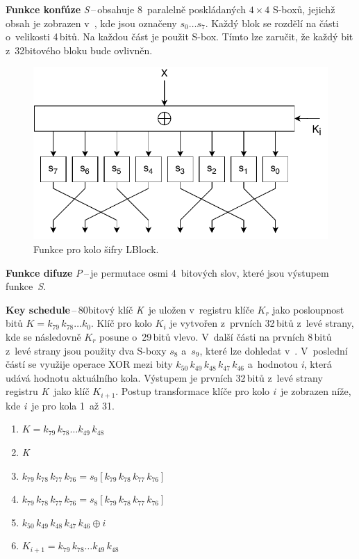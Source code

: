 \noindent \textbf{Funkce konfúze} \textit{S}\,\nobreakdash--\,obsahuje 8~paralelně poskládaných $4\times4$ S-boxů, jejichž obsah je zobrazen v~, kde jsou označeny $s_0\dots s_7$. Každý blok se rozdělí na části o~velikosti 4\,bitů. Na každou část je použit S-box. Tímto lze zaručit, že každý bit z~32bitového bloku bude ovlivněn.\cite{LBlock}
\begin{figure}[!h]
  \begin{center}
    \includegraphics[scale=0.8]{obrazky/RoundLBLOCK.pdf}
  \end{center}
  \caption[Funkce pro kolo šifry LBlock]{Funkce pro kolo šifry LBlock.\cite{LBlock}}
  \label{img:roundLblock}
\end{figure}

\noindent \textbf{Funkce difuze} \textit{P}\,\nobreakdash--\,je permutace osmi 4~bitových slov, které jsou výstupem funkce~\textit{S}.

\noindent \textbf{Key schedule}\,\nobreakdash--\,80bitový klíč \textit{K}~je uložen v~registru klíče $K_r$ jako posloupnost bitů $K = k_{79}\,k_{78}\dots k_{0}$. Klíč pro kolo $K_i$ je vytvořen z~prvních 32\,bitů z~levé strany, kde se následovně $K_r$ posune o~29\,bitů vlevo. V~další části na prvních 8\,bitů z~levé strany jsou použity dva S-boxy $s_8$ a~$s_9$, které lze dohledat v~. V~poslední částí se využije operace XOR mezi bity $k_{50}\,k_{49}\,k_{48}\,k_{47}\,k_{46}$ a~hodnotou \textit{i}, která udává hodnotu aktuálního kola. Výstupem je prvních 32\,bitů z~levé strany registru \textit{K}~jako klíč $K_{i+1}$. Postup transformace klíče pro kolo \textit{i}~je zobrazen níže, kde \textit{i}~je pro kola 1~až 31.\cite{LBlock}
\begin{enumerate}[label=(\Alph*)]
    \item $K = k_{79}\,k_{78}\dots k_{49}\,k_{48}$
    \item \textit{K} 
    \item $k_{79}\,k_{78}\,k_{77}\,k_{76} = s_9 [k_{79}\,k_{78}\,k_{77}\,k_{76}]$
    \item $k_{79}\,k_{78}\,k_{77}\,k_{76} = s_8 [k_{79}\,k_{78}\,k_{77}\,k_{76}]$
    \item $k_{50}\,k_{49}\,k_{48}\,k_{47}\,k_{46} \oplus i$ 
    \item $K_{i+1} = k_{79}\,k_{78}\dots k_{49}\,k_{48}$
\end{enumerate}

